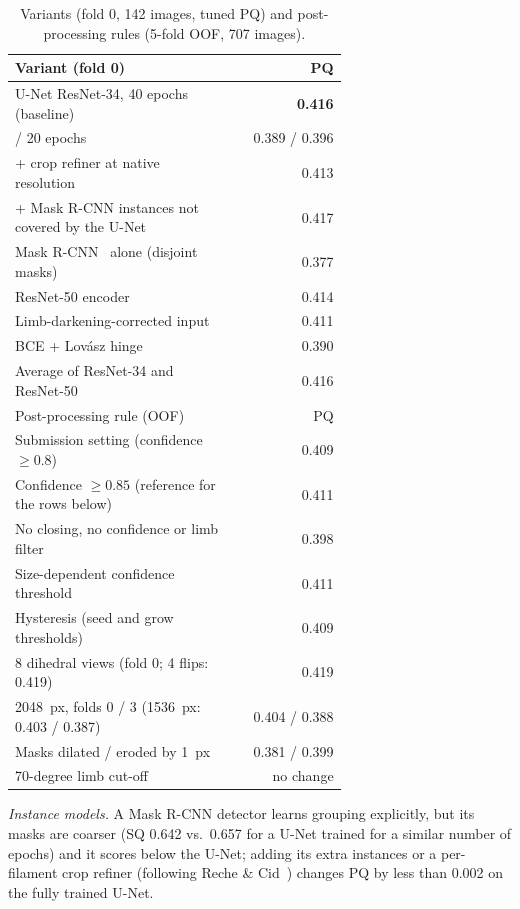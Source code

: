\documentclass[conference]{IEEEtran}
\begin{document}
\begin{table}[t]
\centering
\caption{Variants (fold 0, 142 images, tuned PQ) and post-processing rules (5-fold OOF, 707 images).}
\label{tab:abl}
\small
\begin{tabular}{@{}p{0.66\linewidth}r@{}}
\toprule
Variant (fold 0) & PQ \\
\midrule
U-Net ResNet-34, 40 epochs (baseline) & \textbf{0.416} \\
\quad 10 / 20 epochs & 0.389 / 0.396 \\
\quad + crop refiner at native resolution & 0.413 \\
\quad + Mask R-CNN instances not covered by the U-Net & 0.417 \\
Mask R-CNN~\cite{maskrcnn} alone (disjoint masks) & 0.377 \\
ResNet-50 encoder & 0.414 \\
Limb-darkening-corrected input & 0.411 \\
BCE + Lov\'asz hinge~\cite{lovasz} & 0.390 \\
Average of ResNet-34 and ResNet-50 & 0.416 \\
\midrule
Post-processing rule (OOF) & PQ \\
\midrule
Submission setting (confidence $\geq 0.8$) & 0.409 \\
Confidence $\geq 0.85$ (reference for the rows below) & 0.411 \\
No closing, no confidence or limb filter & 0.398 \\
Size-dependent confidence threshold & 0.411 \\
Hysteresis (seed and grow thresholds) & 0.409 \\
8 dihedral views (fold 0; 4 flips: 0.419) & 0.419 \\
2048~px, folds 0 / 3 (1536~px: 0.403 / 0.387) & 0.404 / 0.388 \\
Masks dilated / eroded by 1~px & 0.381 / 0.399 \\
70-degree limb cut-off & no change \\
\bottomrule
\end{tabular}
\end{table}

\emph{Instance models.} A Mask R-CNN detector learns grouping explicitly, but its masks are coarser
(SQ 0.642 vs.\ 0.657 for a U-Net trained for a similar number of epochs) and it scores below the U-Net; adding its extra instances or a per-filament crop
refiner (following Reche \& Cid~\cite{reche2026}) changes PQ by less than 0.002 on the
fully trained U-Net.
\end{document}

